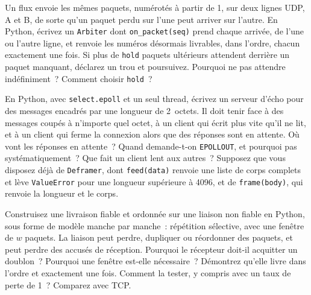 \begin{question}\label{iq:iv3:operating-systems-concurrency-and-networks:37}
Un flux envoie les mêmes paquets, numérotés à partir de 1, sur deux lignes UDP, A et B, de sorte qu'un paquet perdu sur l'une peut arriver sur l'autre. En Python, écrivez un \texttt{Arbiter} dont \texttt{on\_packet(seq)} prend chaque arrivée, de l'une ou l'autre ligne, et renvoie les numéros désormais livrables, dans l'ordre, chacun exactement une fois. Si plus de \texttt{hold} paquets ultérieurs attendent derrière un paquet manquant, déclarez un trou et poursuivez. Pourquoi ne pas attendre indéfiniment~? Comment choisir \texttt{hold}~?
\end{question}

\begin{question}\label{iq:iv3:operating-systems-concurrency-and-networks:38}
En Python, avec \texttt{select.epoll} et un seul thread, écrivez un serveur d'écho pour des messages encadrés par une longueur de 2~octets. Il doit tenir face à des messages coupés à n'importe quel octet, à un client qui écrit plus vite qu'il ne lit, et à un client qui ferme la connexion alors que des réponses sont en attente. Où vont les réponses en attente~? Quand demande-t-on \texttt{EPOLLOUT}, et pourquoi pas systématiquement~? Que fait un client lent aux autres~? Supposez que vous disposez déjà de \texttt{Deframer}, dont \texttt{feed(data)} renvoie une liste de corps complets et lève \texttt{ValueError} pour une longueur supérieure à 4096, et de \texttt{frame(body)}, qui renvoie la longueur et le corps.
\end{question}

\begin{question}\label{iq:iv3:operating-systems-concurrency-and-networks:39}
Construisez une livraison fiable et ordonnée sur une liaison non fiable en Python, sous forme de modèle manche par manche~: répétition sélective, avec une fenêtre de $w$ paquets. La liaison peut perdre, dupliquer ou réordonner des paquets, et peut perdre des accusés de réception. Pourquoi le récepteur doit-il acquitter un doublon~? Pourquoi une fenêtre est-elle nécessaire~? Démontrez qu'elle livre dans l'ordre et exactement une fois. Comment la tester, y compris avec un taux de perte de 1~? Comparez avec TCP.
\end{question}


